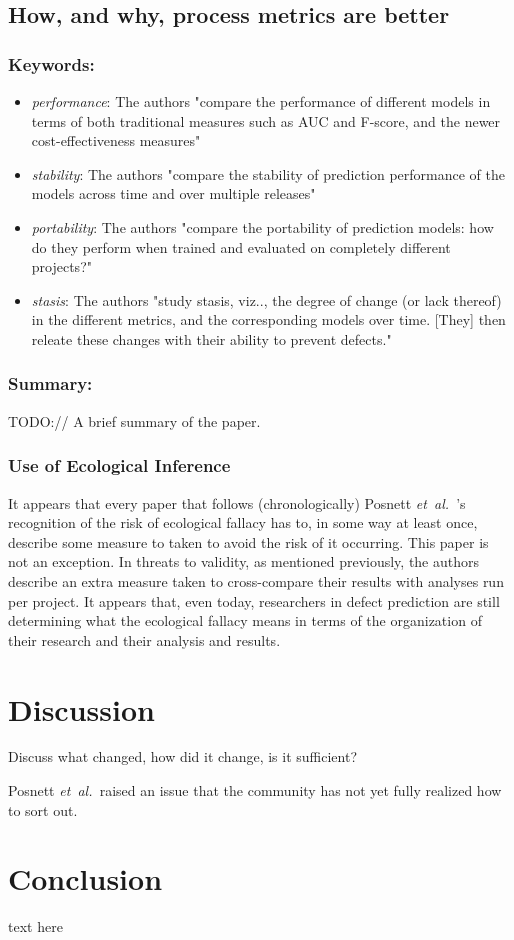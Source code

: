 \documentclass{sig-alternate-05-2015}
\newcommand{\etal}{\mbox{\emph{et al.\ }}}
\begin{document}
\subsection{How, and why, process metrics are better \cite{Rahman:2013}}

\subsubsection{Keywords:}
\begin{itemize}
\item \emph{performance}: The authors "compare the performance of different models in terms of both traditional measures such as AUC and F-score, and the newer cost-effectiveness measures"
\item \emph{stability}: The authors "compare the stability of prediction performance of the models across time and over multiple releases"
\item \emph{portability}: The authors "compare the portability of prediction models: how do they perform when trained and evaluated on completely different projects?"
\item \emph{stasis}: The authors "study stasis, viz.., the degree of change (or lack thereof) in the different metrics, and the corresponding models over time. [They] then releate these changes with their ability to prevent defects."
\end{itemize} 

\subsubsection{Summary:}
TODO:// A brief summary of the paper.

\subsubsection{Use of Ecological Inference}
It appears that every paper that follows (chronologically) Posnett \etal's recognition of the risk of ecological fallacy has to, in some way at least once, describe some measure to taken to avoid the risk of it occurring. This paper is not an exception. In threats to validity, as mentioned previously, the authors describe an extra measure taken to cross-compare their results with analyses run per project. It appears that, even today, researchers in defect prediction are still determining what the ecological fallacy means in terms of the organization of their research and their analysis and results.

\section{Discussion}
Discuss what changed, how did it change, is it sufficient?

Posnett \etal raised an issue that the community has not yet fully realized how to sort out.  

\section{Conclusion}
text here




\balancecolumns %
\end{document}
